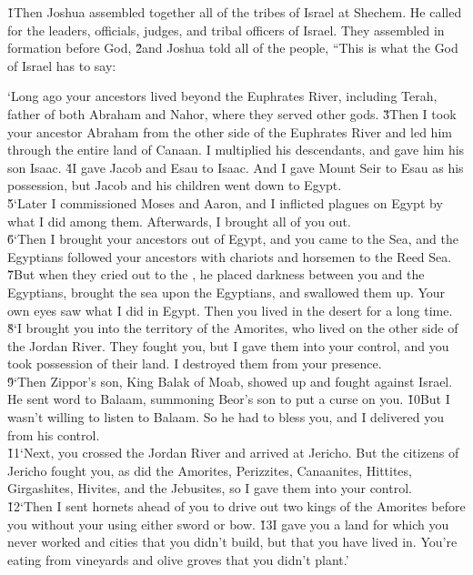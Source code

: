 \v{1}Then Joshua assembled together all of the tribes of Israel at Shechem. He called for the leaders, officials, judges, and tribal officers of Israel. They assembled in formation before God, \v{2}and Joshua told all of the people, ``This is what the  God of Israel has to say:

\begin{poetry}
\poeml `Long ago your ancestors lived beyond the Euphrates River, including Terah, father of both Abraham and Nahor, where they served other gods. \v{3}Then I took your ancestor Abraham from the other side of the Euphrates River and led him through the entire land of Canaan. I multiplied his descendants, and gave him his son Isaac. \v{4}I gave Jacob and Esau to Isaac. And I gave Mount Seir to Esau as his possession, but Jacob and his children went down to Egypt. \\
\poeml \v{5}`Later I commissioned Moses and Aaron, and I inflicted plagues on Egypt by what I did among them. Afterwards, I brought all of you out. \\
\poeml \v{6}`Then I brought your ancestors out of Egypt, and you came to the Sea, and the Egyptians followed your ancestors with chariots and horsemen to the Reed Sea. \v{7}But when they cried out to the , he placed darkness between you and the Egyptians, brought the sea upon the Egyptians, and swallowed them up. Your own eyes saw what I did in Egypt. Then you lived in the desert for a long time. \\
\poeml \v{8}`I brought you into the territory of the Amorites, who lived on the other side of the Jordan River. They fought you, but I gave them into your control, and you took possession of their land. I destroyed them from your presence. \\
\poeml \v{9}`Then Zippor's son, King Balak of Moab, showed up and fought against Israel. He sent word to Balaam, summoning Beor's son to put a curse on you. \v{10}But I wasn't willing to listen to Balaam. So he had to bless you, and I delivered you from his control. \\
\poeml \v{11}`Next, you crossed the Jordan River and arrived at Jericho. But the citizens of Jericho fought you, as did the Amorites, Perizzites, Canaanites, Hittites, Girgashites, Hivites, and the Jebusites, so I gave them into your control. \\
\poeml \v{12}`Then I sent hornets ahead of you to drive out two kings of the Amorites before you without your using either sword or bow. \v{13}I gave you a land for which you never worked and cities that you didn't build, but that you have lived in. You're eating from vineyards and olive groves that you didn't plant.'
\end{poetry}

